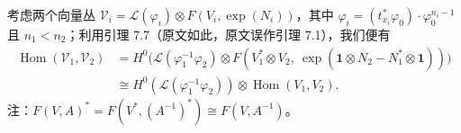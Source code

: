 \documentclass[11pt,a4paper]{article}
\theoremstyle{plain}
\theoremstyle{definition}
\begin{document}
考虑两个向量丛 $\mathcal{V}_i=\mathcal{L}(\varphi_i)\otimes F(V_i,\exp(N_i))$，其中 $\varphi_i=(t^*_{x_i}\varphi_0)\cdot\varphi_0^{n_i-1}$ 且 $n_1<n_2$；利用引理 7.7（原文如此，原文误作引理 7.1），我们便有
\[
\begin{aligned}
\operatorname{Hom}(\mathcal{V}_1,\mathcal{V}_2)
&=H^0\bigl(\mathcal{L}(\varphi_1^{-1}\varphi_2)
  \otimes F(V_1^*\otimes V_2,\ \exp(\mathbf{1}\otimes N_2-N_1^*\otimes\mathbf{1}))\bigr)\\
&\cong H^0(\mathcal{L}(\varphi_1^{-1}\varphi_2))\otimes\operatorname{Hom}(V_1,V_2).
\end{aligned}
\]
注：$F(V,A)^*=F(V^*,(A^{-1})^*)\cong F(V,A^{-1})$。


﻿%
\end{document}
